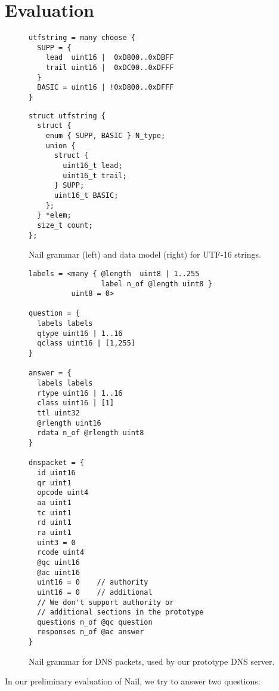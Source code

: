 \section{Evaluation}
\label{s:eval}

\begin{figure*}
\begin{minipage}{\columnwidth}
\begin{verbatim}
utfstring = many choose {
  SUPP = {
    lead  uint16 |  0xD800..0xDBFF
    trail uint16 |  0xDC00..0xDFFF
  }
  BASIC = uint16 | !0xD800..0xDFFF
}
\end{verbatim}
\end{minipage}
\hspace{\columnsep}
\begin{minipage}{\columnwidth}
\begin{verbatim}
struct utfstring {
  struct {
    enum { SUPP, BASIC } N_type;
    union {
      struct {
        uint16_t lead;
        uint16_t trail;
      } SUPP;
      uint16_t BASIC;
    };
  } *elem;
  size_t count;
};
\end{verbatim} 
\end{minipage}
\caption{Nail grammar (left) and data model (right) for UTF-16 strings.}
\label{fig:utf16}
\end{figure*}


\begin{figure}
\begin{verbatim}
labels = <many { @length  uint8 | 1..255 
                 label n_of @length uint8 }
          uint8 = 0>

question = {
  labels labels
  qtype uint16 | 1..16 
  qclass uint16 | [1,255]
}

answer = {
  labels labels
  rtype uint16 | 1..16
  class uint16 | [1]
  ttl uint32
  @rlength uint16 
  rdata n_of @rlength uint8 
}

dnspacket = {
  id uint16
  qr uint1
  opcode uint4
  aa uint1 
  tc uint1
  rd uint1
  ra uint1
  uint3 = 0
  rcode uint4
  @qc uint16
  @ac uint16
  uint16 = 0    // authority 
  uint16 = 0    // additional
  // We don't support authority or 
  // additional sections in the prototype
  questions n_of @qc question
  responses n_of @ac answer
}
\end{verbatim}
\caption{Nail grammar for DNS packets, used by our prototype DNS server.}
\label{fig:dns-full}
\end{figure}


In our preliminary evaluation of Nail, we try to answer two questions:

